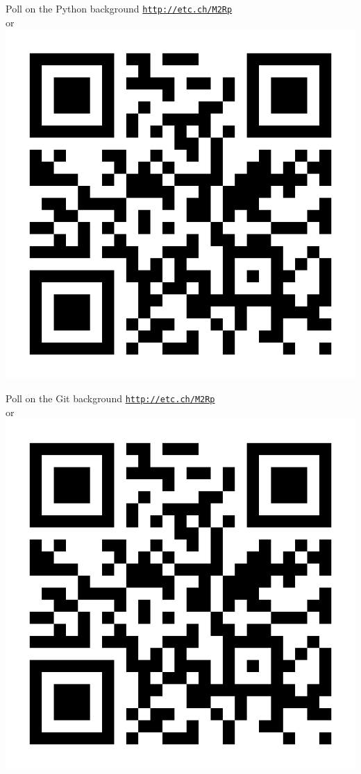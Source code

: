 
\begin{frame}{Poll on the Python background}
\centering 
\vskip 10pt
{\Large \href{http://etc.ch/M2Rp}{\textcolor{indigo(dye)}{\tt http://etc.ch/M2Rp}}}\\ 
or \\[10pt]
\includegraphics[height=0.4\columnwidth]{figures/intro/poll-python-background.png}
\end{frame}


\begin{frame}{Poll on the Git background}
\centering 
\vskip 10pt
{\Large \href{http://etc.ch/M2Rp}{\textcolor{indigo(dye)}{\tt http://etc.ch/M2Rp}}}\\ 
or \\[10pt]
\includegraphics[height=0.4\columnwidth]{figures/intro/poll-python-background.png}
\end{frame}

